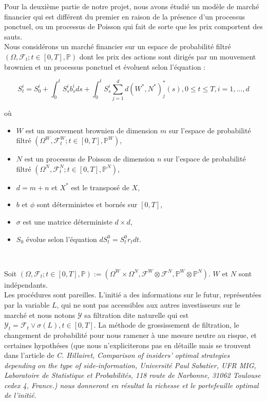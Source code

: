 Pour la deuxième partie de notre projet, nous avons étudié un modèle de marché financier qui est différent du premier en raison de la présence d'un processus ponctuel, ou un processus de Poisson qui fait de sorte que les prix comportent des sauts.\\

Nous considérons un marché financier sur un espace de probabilité filtré $(\Omega, \mathcal{F}_t; t \in [0, T], \mathbb{P})$ dont les prix des actions sont dirigés par un mouvement brownien et un processus ponctuel et évoluent selon l'équation : 

\begin{equation}
S_t^i = S_0^i + \displaystyle \int_{0}^{t}S_s^i b_s^i ds + \int_{0}^{t}S_s^i \sum_{j = 1}^{d} d(W^*, N^*)^{*}_j(s), 0 \leq t \leq T, i = 1, ..., d
\end{equation}

où\\

\begin{itemize} 
\item $W$ est un mouvement brownien de dimension $m$ sur l'espace de probabilité filtré $(\Omega^W, \mathcal{F}^W_t; t \in [0, T], \mathbb{P}^W)$,
\item $N$ est un processus de Poisson de dimension $n$ sur l'espace de probabilité filtré $(\Omega^N, \mathcal{F}^N_t; t \in [0, T], \mathbb{P}^N)$,
\item $d = m+n$ et $X^*$ est le transposé de $X$,
\item $b$ et $\phi$ sont déterministes et bornés sur $[0, T]$,
\item $\sigma$ est une matrice déterministe $d \times d$,
\item $S_0$ évolue selon l'équation $dS^0_t = S^0_t r_t dt$.
\end{itemize}
\

Soit $(\Omega, \mathcal{F}_t; t\in [0, T], \mathbb{P}) := (\Omega^W \times \Omega^N, \mathcal{F}^W \otimes \mathcal{F}^N, \mathbb{P}^W \otimes \mathbb{P}^N)$. $W$ et $N$ sont indépendants. \\

Les procédures sont pareilles. L'initié a des informations sur le futur, représentées par la variable $L$, qui ne sont pas accessibles aux autres investisseurs sur le marché et nous notons $\mathcal{Y}$ sa filtration dite naturelle qui est $\mathcal{Y}_t = \mathcal{F}_t \vee \sigma(L), t \in [0, T]$. La méthode de grossissement de filtration, le changement de probabilité pour nous ramener à une mesure neutre au risque, et certaines hypothéses (que nous n'expliciterons pas en détaille mais se trouvent dans l'article de \itshape{C. Hillairet, Comparison of insiders' optimal strategies depending on the type of side-information, Université Paul Sabatier, UFR MIG, Laboratoire de Statistique et Probabilités, 118 route de Narbonne, 31062 Toulouse cedex 4, France.}) nous donneront en résultat la richesse et le portefeuille optimal de l'initié.